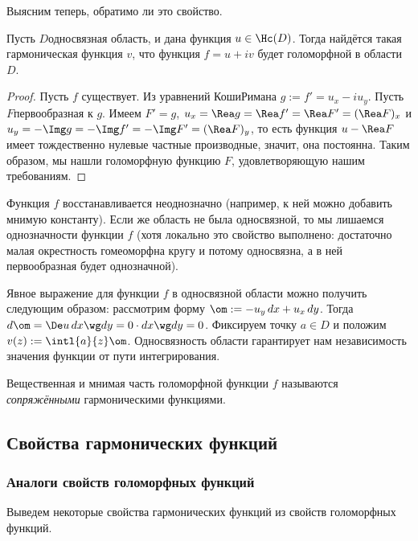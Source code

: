 \documentclass[a4paper]{article}
\begin{document}
Выясним теперь, обратимо ли это свойство.

\begin{stm}
Пусть $D$\т односвязная область, и дана функция $u\in \Hc(D)$. Тогда найдётся такая гармоническая функция $v$,
что функция $f = u+iv$ будет голоморфной в области $D$.
\end{stm}
\begin{proof}
Пусть $f$ существует. Из уравнений Коши\ч Римана $g := f' = u_x-iu_y$. Пусть $F$\т первообразная к $g$. Имеем
$F'=g$, $u_x=\Rea g = \Rea f'= \Rea F'=(\Rea F)_x$ и $u_y=-\Img g= -\Img f'= -\Img F'=(\Rea F)_y$, то есть
функция $u - \Rea F$ имеет тождественно нулевые частные производные, значит, она постоянна. Таким образом, мы
нашли голоморфную функцию $F$, удовлетворяющую нашим требованиям.
\end{proof}

\begin{note}
Функция $f$ восстанавливается неоднозначно (например, к ней можно добавить мнимую константу). Если же область не
была односвязной, то мы лишаемся однозначности функции $f$ (хотя локально это свойство выполнено: достаточно
малая окрестность гомеоморфна кругу и потому односвязна, а в ней первообразная будет однозначной).
\end{note}

Явное выражение для функции $f$ в односвязной области можно получить следующим образом:
рассмотрим форму $\om := -u_y \, dx + u_x\, dy$. Тогда $d\om = \De u \, dx \wg dy = 0 \cdot dx \wg dy = 0$.
Фиксируем точку $a \in D$ и положим $v(z) := \intl{a}{z}\om$. Односвязность области гарантирует нам независимость
значения функции от пути интегрирования.

\begin{df}
Вещественная и мнимая часть голоморфной функции $f$ называются \emph{сопряжёнными} гармоническими функциями.
\end{df}

\subsection{Свойства гармонических функций}

\subsubsection{Аналоги свойств голоморфных функций}

Выведем некоторые свойства гармонических функций из свойств голоморфных функций.
\end{document}
